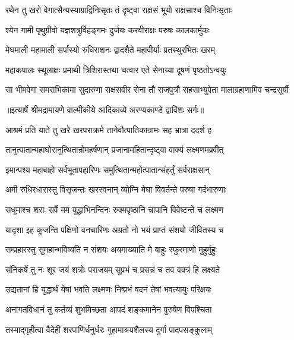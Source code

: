 \twolineshloka
{रथेन तु खरो वेगात्सैन्यस्याग्राद्विनिःसृतः}
{तं दृष्ट्वा राक्षसं भूयो राक्षसाश्च विनिःसृताः} %

\twolineshloka
{श्येन गामी पृथुग्रीवो यज्ञशत्रुर्विहङ्गमः}
{दुर्जयः करवीराक्षः परुषः कालकार्मुकः} %

\twolineshloka
{मेघमाली महामाली सर्पास्यो रुधिराशनः}
{द्वादशैते महावीर्याः प्रतस्थुरभितः खरम्} %

\twolineshloka
{महाकपालः स्थूलाक्षः प्रमाथी त्रिशिरास्तथा}
{चत्वार एते सेनाग्र्या दूषणं पृष्ठतोऽन्वयुः} %

\fourlineindentedshloka
{सा भीमवेगा समराभिकामा}
{सुदारुणा राक्षसवीर सेना}
{तौ राजपुत्रौ सहसाभ्युपेता}
{मालाग्रहाणामिव चन्द्रसूर्यौ} %


{॥इत्यार्षे श्रीमद्रामायणे वाल्मीकीये आदिकाव्ये अरण्यकाण्डे द्वाविंशः सर्गः॥}


\twolineshloka
{आश्रमं प्रति याते तु खरे खरपराक्रमे}
{तानेवौत्पातिकान्रामः सह भ्रात्रा ददर्श ह} %

\twolineshloka
{तानुत्पातान्महाघोरानुत्थितान्रोमहर्षणान्}
{प्रजानामहितान्दृष्ट्वा वाक्यं लक्ष्मणमब्रवीत्} %

\twolineshloka
{इमान्पश्य महाबाहो सर्वभूतापहारिणः}
{समुत्थितान्महोत्पातान्संहर्तुं सर्वराक्षसान्} %

\twolineshloka
{अमी रुधिरधारास्तु विसृजन्तः खरस्वनान्}
{व्योम्नि मेघा विवर्तन्ते परुषा गर्दभारुणाः} %

\twolineshloka
{सधूमाश्च शराः सर्वे मम युद्धाभिनन्दिनः}
{रुक्मपृष्ठानि चापानि विवेष्टन्ते च लक्ष्मण} %

\twolineshloka
{यादृशा इह कूजन्ति पक्षिणो वनचारिणः}
{अग्रतो नो भयं प्राप्तं संशयो जीवितस्य च} %

\twolineshloka
{सम्प्रहारस्तु सुमहान्भविष्यति न संशयः}
{अयमाख्याति मे बाहुः स्फुरमाणो मुहुर्मुहुः} %

\twolineshloka
{संनिकर्षे तु नः शूर जयं शत्रोः पराजयम्}
{सुप्रभं च प्रसन्नं च तव वक्त्रं हि लक्ष्यते} %

\twolineshloka
{उद्यतानां हि युद्धार्थं येषां भवति लक्ष्मणः}
{निष्प्रभं वदनं तेषां भवत्यायुः परिक्षयः} %

\twolineshloka
{अनागतविधानं तु कर्तव्यं शुभमिच्छता}
{आपदं शङ्कमानेन पुरुषेण विपश्चिता} %

\twolineshloka
{तस्माद्गृहीत्वा वैदेहीं शरपाणिर्धनुर्धरः}
{गुहामाश्रयशैलस्य दुर्गां पादपसङ्कुलाम्} %

